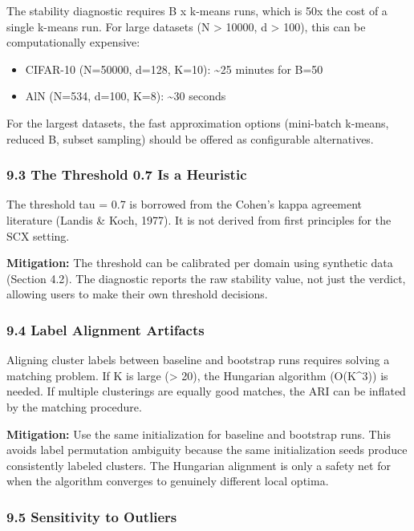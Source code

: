 \documentclass[
  12pt,
]{ctexart}
\providecommand{\tightlist}{%
  \setlength{\itemsep}{0pt}\setlength{\parskip}{0pt}}
\begin{document}
The stability diagnostic requires B x k-means runs, which is 50x the
cost of a single k-means run. For large datasets (N \textgreater{}
10000, d \textgreater{} 100), this can be computationally expensive:

\begin{itemize}
\tightlist
\item
  CIFAR-10 (N=50000, d=128, K=10): \textasciitilde25 minutes for B=50
\item
  AlN (N=534, d=100, K=8): \textasciitilde30 seconds
\end{itemize}

For the largest datasets, the fast approximation options (mini-batch
k-means, reduced B, subset sampling) should be offered as configurable
alternatives.

\subsubsection{9.3 The Threshold 0.7 Is a
Heuristic}\label{the-threshold-0.7-is-a-heuristic}

The threshold tau = 0.7 is borrowed from the Cohen's kappa agreement
literature (Landis \& Koch, 1977). It is not derived from first
principles for the SCX setting.

\textbf{Mitigation:} The threshold can be calibrated per domain using
synthetic data (Section 4.2). The diagnostic reports the raw stability
value, not just the verdict, allowing users to make their own threshold
decisions.

\subsubsection{9.4 Label Alignment
Artifacts}\label{label-alignment-artifacts}

Aligning cluster labels between baseline and bootstrap runs requires
solving a matching problem. If K is large (\textgreater{} 20), the
Hungarian algorithm (O(K\^{}3)) is needed. If multiple clusterings are
equally good matches, the ARI can be inflated by the matching procedure.

\textbf{Mitigation:} Use the same initialization for baseline and
bootstrap runs. This avoids label permutation ambiguity because the same
initialization seeds produce consistently labeled clusters. The
Hungarian alignment is only a safety net for when the algorithm
converges to genuinely different local optima.

\subsubsection{9.5 Sensitivity to
Outliers}\label{sensitivity-to-outliers}
\end{document}
